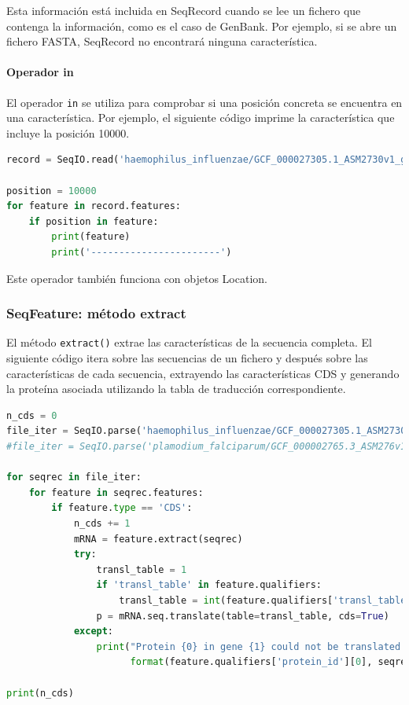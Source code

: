 Esta información está incluida en SeqRecord cuando se lee un fichero que contenga la información, como es el caso de GenBank. Por ejemplo, si se abre un fichero FASTA, SeqRecord no encontrará ninguna característica. 

\paragraph{Operador in}
El operador \texttt{in} se utiliza para comprobar si una posición concreta se encuentra en una característica. Por ejemplo, el siguiente código imprime la característica que incluye la posición 10000.
\begin{lstlisting}[language=Python]
record = SeqIO.read('haemophilus_influenzae/GCF_000027305.1_ASM2730v1_genomic.gbff', 'genbank')

position = 10000
for feature in record.features:
    if position in feature:
        print(feature)
        print('-----------------------')
    \end{lstlisting}

Este operador también funciona con objetos Location. 

\subsubsection{SeqFeature: método extract}
El método \texttt{extract()} extrae las características de la secuencia completa. El siguiente código itera sobre las secuencias de un fichero y después sobre las características de cada secuencia, extrayendo las características CDS y generando la proteína asociada utilizando la tabla de traducción correspondiente.
\begin{lstlisting}[language=Python]
n_cds = 0
file_iter = SeqIO.parse('haemophilus_influenzae/GCF_000027305.1_ASM2730v1_genomic.gbff', 'genbank')
#file_iter = SeqIO.parse('plamodium_falciparum/GCF_000002765.3_ASM276v1_genomic.gbff', 'genbank')

for seqrec in file_iter:
    for feature in seqrec.features:
        if feature.type == 'CDS':
            n_cds += 1
            mRNA = feature.extract(seqrec)
            try:
                transl_table = 1
                if 'transl_table' in feature.qualifiers:
                    transl_table = int(feature.qualifiers['transl_table'][0])
                p = mRNA.seq.translate(table=transl_table, cds=True)
            except:
                print("Protein {0} in gene {1} could not be translated!".
                      format(feature.qualifiers['protein_id'][0], seqrec.id))
          
print(n_cds)
    \end{lstlisting}
    
